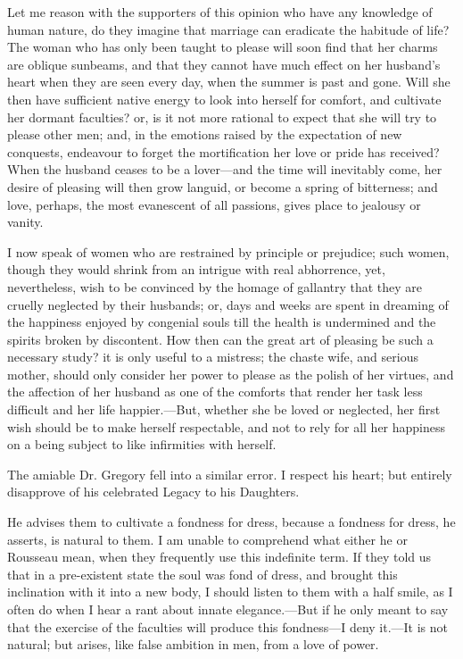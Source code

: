 Let me reason with the supporters of this opinion who have any
knowledge of human nature, do they imagine that marriage can eradicate
the habitude of life? The woman who has only been taught to please
will soon find that her charms are oblique sunbeams, and that they
cannot have much effect on her husband's heart when they are seen
every day, when the summer is past and gone. Will she then have
sufficient native energy to look into herself for comfort, and
cultivate  her dormant faculties? or, is it not more rational
to expect that she will try to please other men; and, in the emotions
raised by the expectation of new conquests, endeavour to forget the
mortification her love or pride has received? When the husband ceases
to be a lover---and the time will inevitably come, her desire of
pleasing will then grow languid, or become a spring of bitterness; and
love, perhaps, the most evanescent of all passions, gives place to
jealousy or vanity.


I now speak of women who are restrained by principle or prejudice;
such women, though they would shrink from an intrigue with real
abhorrence, yet, nevertheless, wish to be convinced by the homage of
gallantry that they are cruelly neglected by their husbands; or, days
and weeks are spent in dreaming of the happiness enjoyed by congenial
souls till the health is undermined and the spirits broken by
discontent. How then can the great art of pleasing be such a necessary
study? it is only useful to a mistress; the chaste wife, and serious
mother, should only consider her power to please as the polish of her
virtues, and the affection of her husband as one of the comforts that
render her task less difficult and  her life happier.---But,
whether she be loved or neglected, her first wish should be to make
herself respectable, and not to rely for all her happiness on a being
subject to like infirmities with herself.

The amiable Dr. Gregory fell into a similar error. I respect his
heart; but entirely disapprove of his celebrated Legacy to his
Daughters.

He advises them to cultivate a fondness for dress, because a fondness
for dress, he asserts, is natural to them. I am unable to comprehend
what either he or Rousseau mean, when they frequently use this
indefinite term. If they told us that in a pre-existent state the soul
was fond of dress, and brought this inclination with it into a new
body, I should listen to them with a half smile, as I often do when I
hear a rant about innate elegance.---But if he only meant to say that
the exercise of the faculties will produce this fondness---I deny
it.---It is not natural; but arises, like false ambition in men, from
a love of power.

